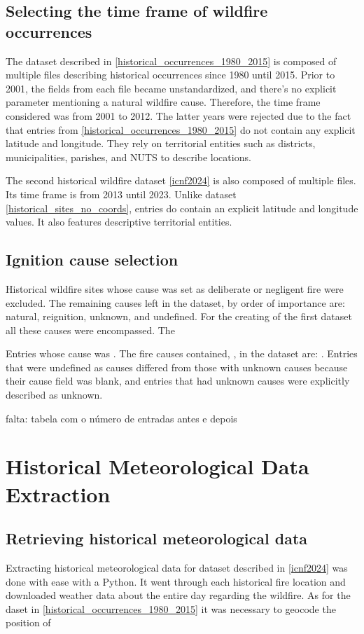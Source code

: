 \subsection{Selecting the time frame of wildfire occurrences}

The dataset described in \ref{historical_occurrences_1980_2015} is composed of multiple files describing historical occurrences since 1980 until 2015. Prior to 2001, the fields from each file became unstandardized, and there's no explicit parameter mentioning a natural wildfire cause. Therefore, the time frame considered was from 2001 to 2012. The latter years were rejected due to the fact that entries from \ref{historical_occurrences_1980_2015} do not contain any explicit latitude and longitude. They rely on territorial entities such as districts, municipalities, parishes, and NUTS to describe locations.

The second historical wildfire dataset \ref{icnf2024} is also composed of multiple files. Its time frame is from 2013 until 2023. Unlike dataset \ref{historical_sites_no_coords}, entries do contain an explicit latitude and longitude values. It also features descriptive territorial entities. 

\subsection{Ignition cause selection}
Historical wildfire sites whose cause was set as deliberate or negligent fire were excluded. The remaining causes left in the dataset, by order of importance are: natural, reignition, unknown, and undefined. For the creating of the first dataset all these causes were encompassed. The 



Entries whose cause was . The fire causes contained, , in the dataset are: .
Entries that were undefined as causes differed from those with unknown causes because their cause field was blank, and entries that had unknown causes were explicitly described as unknown.

falta: tabela com o número de entradas antes e depois




\section{Historical Meteorological Data Extraction}

\subsection{Retrieving historical meteorological data}
Extracting historical meteorological data for dataset described in \ref{icnf2024} was done with ease with a Python. It went through each historical fire location and downloaded weather data about the entire day regarding the wildfire. As for the daset in \ref{historical_occurrences_1980_2015} it was necessary to geocode the position of 

